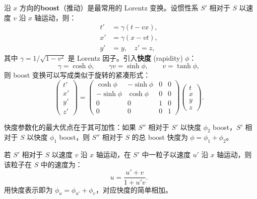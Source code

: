 沿 $x$ 方向的\textbf{boost}（推动）是最常用的 Lorentz 变换。设惯性系 $S'$ 相对于 $S$ 以速度 $v$ 沿 $x$ 轴运动，则：
\begin{equation}\label{eq:boost_x}
    \boxed{
    \begin{aligned}
        t' &= \gamma(t - vx), \\
        x' &= \gamma(x - vt), \\
        y' &= y, \quad z' = z,
    \end{aligned}}
\end{equation}
其中 $\gamma = 1/\sqrt{1 - v^2}$ 是 Lorentz 因子。引入\textbf{快度} (rapidity) $\phi$：
\begin{equation}
    \gamma = \cosh\phi, \qquad \gamma v = \sinh\phi, \qquad v = \tanh\phi,
\end{equation}
则 boost 变换可以写成类似于旋转的紧凑形式：
\begin{equation}\label{eq:boost_rapidity}
    \begin{pmatrix} t' \\ x' \\ y' \\ z' \end{pmatrix}
    = \begin{pmatrix}
        \cosh\phi & -\sinh\phi & 0 & 0 \\
        -\sinh\phi  & \cosh\phi  & 0 & 0 \\
        0 & 0 & 1 & 0 \\
        0 & 0 & 0 & 1
    \end{pmatrix}
    \begin{pmatrix} t \\ x \\ y \\ z \end{pmatrix}.
\end{equation}

快度参数化的最大优点在于其可加性：如果 $S''$ 相对于 $S'$ 以快度 $\phi_2$ boost，$S'$ 相对于 $S$ 以快度 $\phi_1$ boost，则 $S''$ 相对于 $S$ 的总 boost 快度为 $\phi = \phi_1 + \phi_2$。

\begin{theorem}[相对论速度加法公式]
若 $S'$ 相对于 $S$ 以速度 $v$ 沿 $x$ 轴运动，在 $S'$ 中一粒子以速度 $u'$ 沿 $x$ 轴运动，则该粒子在 $S$ 中的速度为：
\begin{equation}\label{eq:velocity_addition}
    u = \frac{u' + v}{1 + u'v}.
\end{equation}
用快度表示即为 $\phi_u = \phi_{u'} + \phi_v$，对应快度的简单相加。
\end{theorem}

